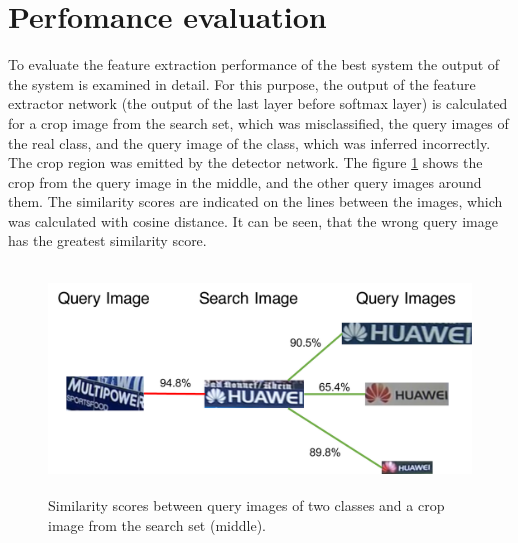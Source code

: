 \section{Perfomance evaluation}
To evaluate the feature extraction performance of the best system the output of the system is examined in detail. For this purpose, the output of the feature extractor network (the output of the last layer before softmax layer) is calculated for a crop image from the search set, which was misclassified, the query images of the real class, and the query image of the class, which was inferred incorrectly. The crop region was emitted by the detector network. The figure \ref{f:misclass} shows the crop from the query image in the middle, and the other query images around them. The similarity scores are indicated on the lines between the images, which was calculated with cosine distance. It can be seen, that the wrong query image has the greatest similarity score.
\begin{figure}
  \centering
  \includegraphics[height=60mm]{images/mt/misclass.pdf}
  \caption{Similarity scores between query images of two classes and a crop image from the search set (middle).}
  \label{f:misclass}
\end{figure}

